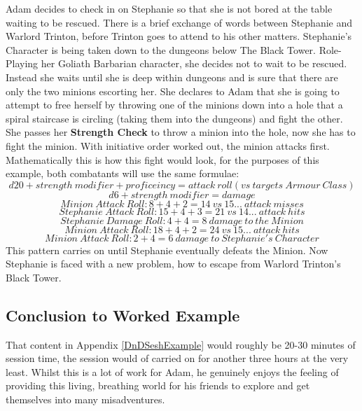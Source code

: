 \documentclass[review]{cmpreport}
\begin{document}
	Adam decides to check in on Stephanie so that she is not bored at the table waiting to be rescued. There is a brief exchange of words between Stephanie and Warlord Trinton, before Trinton goes to attend to his other matters. Stephanie's Character is being taken down to the dungeons below The Black Tower. Role-Playing her Goliath Barbarian character, she decides not to wait to be rescued. Instead she waits until she is deep within dungeons and is sure that there are only the two minions escorting her. She declares to Adam that she is going to attempt to free herself by throwing one of the minions down into a hole that a spiral staircase is circling (taking them into the dungeons) and fight the other. She passes her \textbf{Strength Check} to throw a minion into the hole, now she has to fight the minion. With initiative order worked out, the minion attacks first. Mathematically this is how this fight would look, for the purposes of this example, both combatants will use the same formulae:
	\[d20 + strength \ modifier + proficeincy = attack \ roll (vs \ targets \ Armour \ Class)\]
	\[d6 + strength \ modifier = damage\]
	\[Minion \ Attack \ Roll: 8 + 4 + 2 = 14 \ vs \ 15 ... \ attack \ misses\]
	\[Stephanie \ Attack \ Roll: 15 + 4 + 3 = 21 \ vs \ 14 ... \ attack \ hits\]
	\[Stephanie \ Damage \ Roll: 4 + 4 = 8 \ damage \ to \ the \ Minion\]
	\[Minion \ Attack \ Roll: 18 + 4 + 2 = 24 \ vs \ 15 ... \ attack \ hits\]
	\[Minion \ Attack \ Roll: 2 + 4 = 6 \ damage \ to \ Stephanie's \ Character\]
	This pattern carries on until Stephanie eventually defeats the Minion. Now Stephanie is faced with a new problem, how to escape from Warlord Trinton's Black Tower.
	
	\subsection{Conclusion to Worked Example}\label{DnDWEConc}
	That content in Appendix \ref{DnDSeshExample} would roughly be 20-30 minutes of session time, the session would of carried on for another three hours at the very least. Whilst this is a lot of work for Adam, he genuinely enjoys the feeling of providing this living, breathing world for his friends to explore and get themselves into many misadventures.
	
	\clearpage
	

\end{document}
